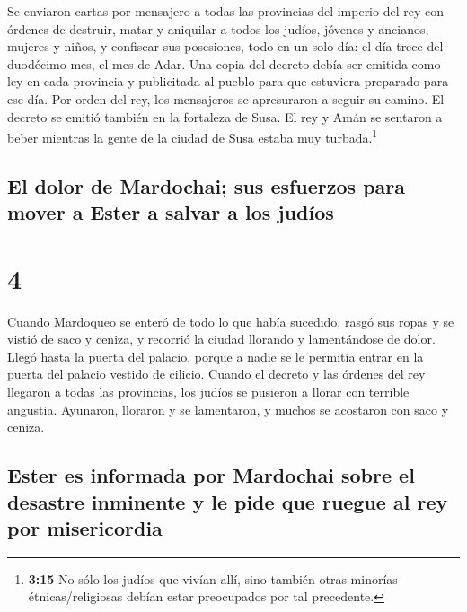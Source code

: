  Se enviaron cartas por mensajero a todas las provincias
del imperio del rey con órdenes de destruir, matar y aniquilar a todos
los judíos, jóvenes y ancianos, mujeres y niños, y confiscar sus
posesiones, todo en un solo día: el día trece del duodécimo mes, el mes
de Adar.  Una copia del decreto debía ser emitida como
ley en cada provincia y publicitada al pueblo para que estuviera
preparado para ese día.  Por orden del rey, los
mensajeros se apresuraron a seguir su camino. El decreto se emitió
también en la fortaleza de Susa. El rey y Amán se sentaron a beber
mientras la gente de la ciudad de Susa estaba muy turbada.\footnote{\textbf{3:15}
  No sólo los judíos que vivían allí, sino también otras minorías
  étnicas/religiosas debían estar preocupados por tal precedente.}

\hypertarget{el-dolor-de-mardochai-sus-esfuerzos-para-mover-a-ester-a-salvar-a-los-juduxedos}{%
\subsection{El dolor de Mardochai; sus esfuerzos para mover a Ester a
salvar a los
judíos}\label{el-dolor-de-mardochai-sus-esfuerzos-para-mover-a-ester-a-salvar-a-los-juduxedos}}

\hypertarget{section-3}{%
\section{4}\label{section-3}}

 Cuando Mardoqueo se enteró de todo lo que había sucedido,
rasgó sus ropas y se vistió de saco y ceniza, y recorrió la ciudad
llorando y lamentándose de dolor.  Llegó hasta la puerta
del palacio, porque a nadie se le permitía entrar en la puerta del
palacio vestido de cilicio.  Cuando el decreto y las
órdenes del rey llegaron a todas las provincias, los judíos se pusieron
a llorar con terrible angustia. Ayunaron, lloraron y se lamentaron, y
muchos se acostaron con saco y ceniza.

\hypertarget{ester-es-informada-por-mardochai-sobre-el-desastre-inminente-y-le-pide-que-ruegue-al-rey-por-misericordia}{%
\subsection{Ester es informada por Mardochai sobre el desastre inminente
y le pide que ruegue al rey por
misericordia}\label{ester-es-informada-por-mardochai-sobre-el-desastre-inminente-y-le-pide-que-ruegue-al-rey-por-misericordia}}

